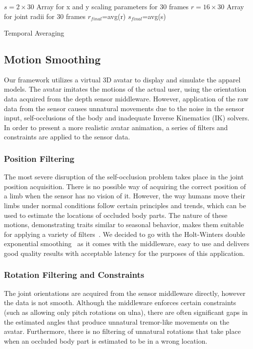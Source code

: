 \documentclass[number,preprint,review,12pt]{elsarticle}
\begin{document}
\singlespacing

\begin{algorithm}
\DontPrintSemicolon %
$s=2 \times 30 $ Array for x and y scaling parameters for 30 frames\;
$r=16 \times 30 $ Array for joint radii for 30 frames\;
$r_\textit{final}$=avg(r)\;
$s_\textit{final}$=avg(s)\;
\caption{Temporal Averaging}
\label{algo:temporal_averaging}
\end{algorithm}

\doublespacing


\subsection{Motion Smoothing}
\label{subsec:Motion}
Our framework utilizes a virtual 3D avatar to display and simulate the apparel models. The avatar imitates the motions of the actual user, using the orientation data acquired from the depth sensor middleware. However, application of the raw data from the sensor causes unnatural movements due to the noise in the sensor input, self-occlusions of the body and inadequate Inverse Kinematics (IK) solvers.  In order to present a more realistic avatar animation, a series of filters and constraints are applied to the sensor data. 

\subsubsection{Position Filtering}
The most severe disruption of the self-occlusion problem takes place in the joint position acquisition. There is no possible way of acquiring the correct position of a limb when the sensor has no vision of it. However, the way humans move their limbs under normal conditions follow certain principles and trends, which can be used to estimate the locations of occluded body parts. The nature of these motions, demonstrating traits similar to seasonal behavior, makes them suitable for applying a variety of filters~\cite{Azimi2012}. We decided to go with the Holt-Winters double exponential smoothing~\cite{Holt1957,Kalekar2004} as it comes with the middleware, easy to use and delivers good quality results with acceptable latency for the purposes of this application. 

\subsubsection{Rotation Filtering and Constraints}
The joint orientations are acquired from the sensor middleware directly, however the data is not smooth. Although the middleware enforces certain constraints (such as allowing only pitch rotations on ulna), there are often significant gaps in the estimated angles that produce unnatural tremor-like movements on the avatar. Furthermore, there is no filtering of unnatural rotations that take place when an occluded body part is estimated to be in a wrong location. 
\end{document}
